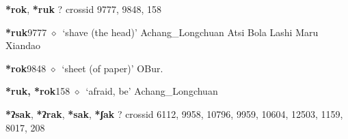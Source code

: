 \item
\textbf{*rok}, \textbf{*ruk}
?
  {\tiny crossid 9777, 9848, 158}
  \begin{list}{}{\leftmargin=1.5em \itemindent=-1.5em}
  \item {\footnotesize \textbf{*ruk}}{\tiny 9777}
         $\diamond$~`shave (the head)'
         Achang\_Longchuan 
\hspace{1ex}
         Atsi 
\hspace{1ex}
         Bola 
\hspace{1ex}
         Lashi 
\hspace{1ex}
         Maru 
\hspace{1ex}
         Xiandao 
  \item {\footnotesize \textbf{*rok}}{\tiny 9848}
\hspace{1ex}
         $\diamond$~`sheet (of paper)'
         OBur. 
  \item {\footnotesize \textbf{*ruk, *rok}}{\tiny 158}
\hspace{1ex}
         $\diamond$~`afraid, be'
         Achang\_Longchuan 
  \end{list}
\item
\textbf{*ʔsak}, \textbf{*ʔrak}, \textbf{*sak}, \textbf{*ʃak}
?
  {\tiny crossid 6112, 9958, 10796, 9959, 10604, 12503, 1159, 8017, 208}
